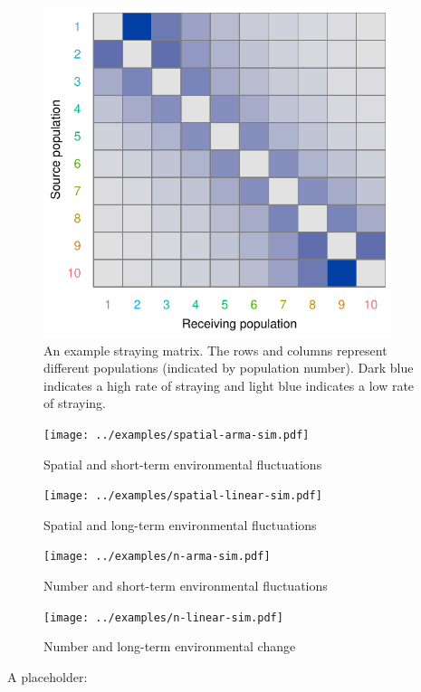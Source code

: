 \clearpage

\begin{figure}[htbp]
\centering
\includegraphics[width=4.0in]{../examples/figure/stray-matrix.pdf}
\caption{An example straying matrix. The rows and columns represent different 
populations (indicated by population number). Dark blue indicates a high rate 
of straying and light blue indicates a low rate of straying.}
\label{f:stray}
\end{figure}

\clearpage

\begin{figure}[htbp]
\centering
\texttt{[image: ../examples/spatial-arma-sim.pdf]}
\caption{Spatial and short-term environmental fluctuations}
\label{f:eg-sp-arma}
\end{figure}

\clearpage

\begin{figure}[htbp]
\centering
\texttt{[image: ../examples/spatial-linear-sim.pdf]}
\caption{Spatial and long-term environmental fluctuations}
\label{f:eg-sp-linear}
\end{figure}

\clearpage

\begin{figure}[htbp]
\centering
\texttt{[image: ../examples/n-arma-sim.pdf]}
\caption{Number and short-term environmental fluctuations}
\label{f:eg-n-arma}
\end{figure}

\clearpage

\begin{figure}[htbp]
\centering
\texttt{[image: ../examples/n-linear-sim.pdf]}
\caption{Number and long-term environmental change}
\label{f:eg-n-linear}
\end{figure}

\clearpage

A placeholder: \citep{schindler2010}




